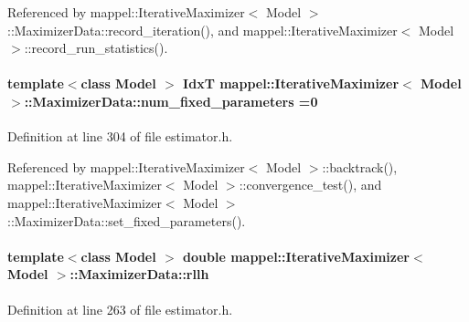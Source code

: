 Referenced by mappel\+::\+Iterative\+Maximizer$<$ Model $>$\+::\+Maximizer\+Data\+::record\+\_\+iteration(), and mappel\+::\+Iterative\+Maximizer$<$ Model $>$\+::record\+\_\+run\+\_\+statistics().

\paragraph[{\texorpdfstring{num\+\_\+fixed\+\_\+parameters}{num_fixed_parameters}}]{\setlength{\rightskip}{0pt plus 5cm}template$<$class Model $>$ {\bf IdxT} {\bf mappel\+::\+Iterative\+Maximizer}$<$ Model $>$\+::Maximizer\+Data\+::num\+\_\+fixed\+\_\+parameters =0}\hypertarget{classmappel_1_1IterativeMaximizer_1_1MaximizerData_a879d1d118434be05d354e894c422cb92}{}\label{classmappel_1_1IterativeMaximizer_1_1MaximizerData_a879d1d118434be05d354e894c422cb92}


Definition at line 304 of file estimator.\+h.



Referenced by mappel\+::\+Iterative\+Maximizer$<$ Model $>$\+::backtrack(), mappel\+::\+Iterative\+Maximizer$<$ Model $>$\+::convergence\+\_\+test(), and mappel\+::\+Iterative\+Maximizer$<$ Model $>$\+::\+Maximizer\+Data\+::set\+\_\+fixed\+\_\+parameters().

\paragraph[{\texorpdfstring{rllh}{rllh}}]{\setlength{\rightskip}{0pt plus 5cm}template$<$class Model $>$ double {\bf mappel\+::\+Iterative\+Maximizer}$<$ Model $>$\+::Maximizer\+Data\+::rllh}\hypertarget{classmappel_1_1IterativeMaximizer_1_1MaximizerData_a224b29201511a2ab8ca86535631c41ef}{}\label{classmappel_1_1IterativeMaximizer_1_1MaximizerData_a224b29201511a2ab8ca86535631c41ef}


Definition at line 263 of file estimator.\+h.



